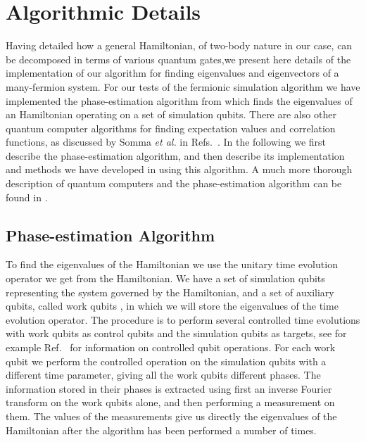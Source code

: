 \section{Algorithmic Details}
\label{sec:details}
Having detailed how a general Hamiltonian, of two-body nature in our case,
can be decomposed in terms of various quantum gates,we present here details of the 
implementation of our algorithm for finding eigenvalues and eigenvectors of
a many-fermion system.
For our tests of the fermionic simulation algorithm we have
implemented the phase-estimation algorithm from \cite{nielsen2000}
which finds the eigenvalues of an Hamiltonian operating on a set of
simulation qubits.  There are also other quantum computer algorithms for
finding expectation values and correlation functions, as discussed by Somma {\em et al.} in 
Refs.~\cite{somma2002,somma2005}. 
In the following we first describe the phase-estimation algorithm, and
then describe its implementation  and methods we have developed
in using this algorithm. A much more thorough description of quantum
computers and the phase-estimation algorithm can be found in
\cite{ovrum2003}. 


\subsection{Phase-estimation Algorithm}

To find the eigenvalues of the Hamiltonian we use
the unitary time evolution operator we get from the Hamiltonian. 
We have a set of simulation qubits representing the system governed by
the Hamiltonian, and a set of auxiliary qubits, called work qubits \cite{lloyd1997,lloyd1999a}, in
which we will store the eigenvalues of the time evolution operator.
The procedure is to perform several controlled time evolutions with
work 
qubits as control qubits and the simulation qubits as targets,  
see for example Ref.~\cite{nielsen2000} for information on controlled qubit
operations. 
For
each work qubit we perform the controlled operation on the simulation
qubits with a different time parameter, giving all the work qubits
different phases. The information stored in their phases is extracted
using first an inverse Fourier transform on the work qubits alone, and
then performing a measurement on them. The values of the
measurements give us directly the eigenvalues of the Hamiltonian after
the algorithm has been performed a number of times.

